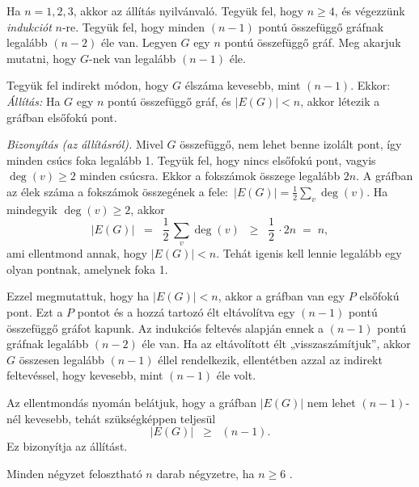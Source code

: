 \begin{solution}
Ha $n=1,2,3$, akkor az állítás nyilvánvaló. Tegyük fel, hogy $n\ge4$,
és végezzünk \emph{indukciót} $n$-re. Tegyük fel, hogy minden $(n-1)$
pontú összefüggő gráfnak legalább $(n-2)$ éle van. Legyen $G$ egy
$n$ pontú összefüggő gráf. Meg akarjuk mutatni, hogy $G$-nek van
legalább $(n-1)$ éle.

Tegyük fel indirekt módon, hogy $G$ élszáma kevesebb, mint $(n-1)$.
Ekkor: \textit{Állítás:} Ha $G$ egy $n$ pontú összefüggő gráf, és
$|E(G)|<n$, akkor létezik a gráfban elsőfokú pont.

\emph{Bizonyítás (az állításról).} Mivel $G$ összefüggő, nem lehet
benne izolált pont, így minden csúcs foka legalább 1. Tegyük fel,
hogy nincs elsőfokú pont, vagyis $\deg(v)\ge2$ minden csúcsra. Ekkor
a fokszámok összege legalább $2n$. A gráfban az élek száma a fokszámok
összegének a fele: $\,|E(G)|=\tfrac{1}{2}\sum_{v}\deg(v)$. Ha mindegyik
$\deg(v)\ge2$, akkor 
\[
|E(G)|\;\;=\;\;\frac{1}{2}\,\sum_{v}\deg(v)\;\;\ge\;\;\frac{1}{2}\,\cdot2n\;=\;n,
\]
ami ellentmond annak, hogy $|E(G)|<n$. Tehát igenis kell lennie legalább
egy olyan pontnak, amelynek foka 1.

\medskip{}
Ezzel megmutattuk, hogy ha $|E(G)|<n$, akkor a gráfban van egy $P$
elsőfokú pont. Ezt a $P$ pontot és a hozzá tartozó élt eltávolítva
egy $(n-1)$ pontú összefüggő gráfot kapunk. Az indukciós feltevés
alapján ennek a $(n-1)$ pontú gráfnak legalább $(n-2)$ éle van.
Ha az eltávolított élt „visszaszámítjuk”, akkor $G$ összesen legalább
$(n-1)$ éllel rendelkezik, ellentétben azzal az indirekt feltevéssel,
hogy kevesebb, mint $(n-1)$ éle volt.

\noindent Az ellentmondás nyomán belátjuk, hogy a gráfban $|E(G)|$
nem lehet $(n-1)$-nél kevesebb, tehát szükségképpen teljesül 
\[
|E(G)|\;\;\ge\;\;(n-1).
\]
Ez bizonyítja az állítást. 
\end{solution}
\begin{problem}
Minden négyzet felosztható $n$ darab négyzetre, ha $n\ge6$ . 
\end{problem}

